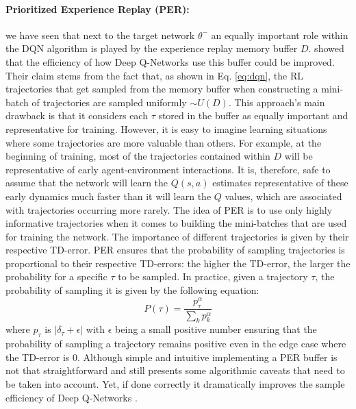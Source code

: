 \paragraph{Prioritized Experience Replay (PER):} we have seen that next to the target network $\theta^{-}$ an equally important role within the DQN algorithm is played by the experience replay memory buffer $D$. \citet{schaul2015prioritized} showed that the efficiency of how Deep Q-Networks use this buffer could be improved. Their claim stems from the fact that, as shown in Eq. \ref{eq:dqn}, the RL trajectories that get sampled from the memory buffer when constructing a mini-batch of trajectories are sampled uniformly $\sim U(D)$. This approach's main drawback is that it considers each $\tau$ stored in the buffer as equally important and representative for training. However, it is easy to imagine learning situations where some trajectories are more valuable than others. For example, at the beginning of training, most of the trajectories contained within $D$ will be representative of early agent-environment interactions. It is, therefore, safe to assume that the network will learn the $Q(s,a)$ estimates representative of these early dynamics much faster than it will learn the $Q$ values, which are associated with trajectories occurring more rarely. The idea of PER is to use only highly informative trajectories when it comes to building the mini-batches that are used for training the network. The importance of different trajectories is given by their respective TD-error. PER ensures that the probability of sampling trajectories is proportional to their respective TD-errors: the higher the TD-error, the larger the probability for a specific $\tau$ to be sampled. In practice, given a trajectory $\tau$, the probability of sampling it is given by the following equation:
\begin{equation}
	P(\tau)=\frac{p_{\tau}^{\alpha}}{\sum_k p_{k}^{\alpha}}
\end{equation}
where $p_{\tau}$ is $|\delta_\tau + \epsilon|$ with $\epsilon$ being a small positive number ensuring that the probability of sampling a trajectory remains positive even in the edge case where the TD-error is $0$. Although simple and intuitive implementing a PER buffer is not that straightforward and still presents some algorithmic caveats that need to be taken into account. Yet, if done correctly it dramatically improves the sample efficiency of Deep Q-Networks \cite{narasimhan2015language}.

